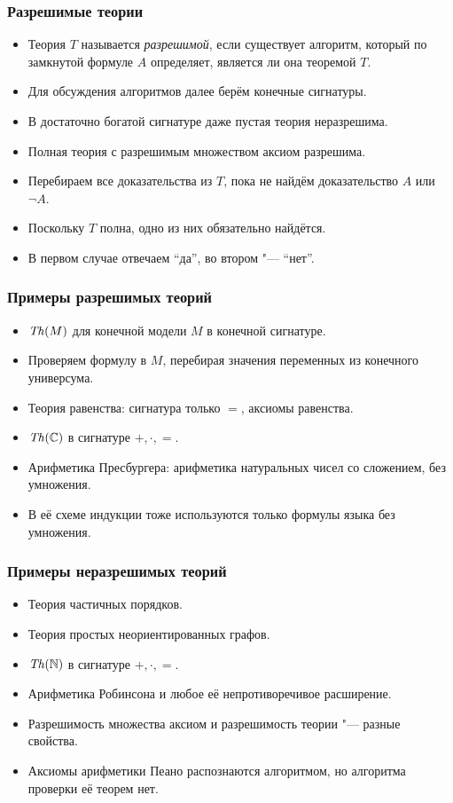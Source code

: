 \documentclass[10pt]{beamer}
\begin{document}
\begin{frame}
    \frametitle{Разрешимые теории}
    \begin{itemize}
        \item Теория $T$ называется \emph{разрешимой}, если существует алгоритм, который по замкнутой формуле $A$ определяет, является ли она теоремой $T$.
        \item Для обсуждения алгоритмов далее берём конечные сигнатуры.
        \item В достаточно богатой сигнатуре даже пустая теория неразрешима. \pause
        \item Полная теория с разрешимым множеством аксиом разрешима.
        \item Перебираем все доказательства из $T$, пока не найдём доказательство $A$ или $\neg A$.
        \item Поскольку $T$ полна, одно из них обязательно найдётся.
        \item В первом случае отвечаем \enquote{да}, во втором "--- \enquote{нет}.
    \end{itemize}
\end{frame}

\begin{frame}
    \frametitle{Примеры разрешимых теорий}
    \begin{itemize}
        \item $\mathit{Th}(M)$ для конечной модели $M$ в конечной сигнатуре.
        \item Проверяем формулу в $M$, перебирая значения переменных из конечного универсума. \pause
        \item Теория равенства: сигнатура только $=$, аксиомы равенства.
        \item $\mathit{Th}(\mathbb{C})$ в сигнатуре $+,\cdot,=$.
        \item Арифметика Пресбургера: арифметика натуральных чисел со сложением, без умножения.
        \item В её схеме индукции тоже используются только формулы языка без умножения.
    \end{itemize}
\end{frame}

\begin{frame}
    \frametitle{Примеры неразрешимых теорий}
    \begin{itemize}
        \item Теория частичных порядков.
        \item Теория простых неориентированных графов.
        \item $\mathit{Th}(\mathbb{N})$ в сигнатуре $+,\cdot,=$.
        \item Арифметика Робинсона и любое её непротиворечивое расширение. \pause
        \item Разрешимость множества аксиом и разрешимость теории "--- разные свойства.
        \item Аксиомы арифметики Пеано распознаются алгоритмом, но алгоритма проверки её теорем нет.
    \end{itemize}
\end{frame}
\end{document}
